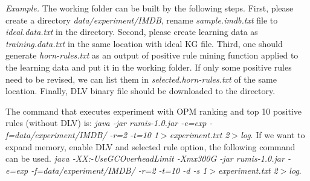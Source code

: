 \textit{Example.} The working folder can be built by the following steps. First, please create a directory \textit{data/experiment/IMDB}, rename \textit{sample.imdb.txt} file to \textit{ideal.data.txt} in the directory. Second, please create learning data as \textit{training.data.txt} in the same location with ideal KG file. Third, one should generate \textit{horn-rules.txt} as an output of positive rule mining function applied to the learning data and put it in the working folder. If only some positive rules need to be revised, we can list them in \textit{selected.horn-rules.txt} of the same location. Finally, DLV binary file should be downloaded to the directory.

The command that executes experiment with OPM ranking and top 10 positive rules (without DLV) is: \textit{java -jar rumis-1.0.jar -e=exp -f=data/experiment/IMDB/ -r=2 -t=10 1$>$experiment.txt 2$>$log}. If we want to expand memory, enable DLV and selected rule option, the following command can be used. \textit{java -XX:-UseGCOverheadLimit -Xmx300G -jar rumis-1.0.jar -e=exp -f=data/experiment/IMDB/ -r=2 -t=10 -d -s 1$>$experiment.txt 2$>$log}.